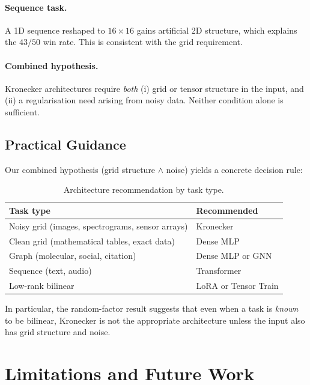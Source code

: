\documentclass[11pt,a4paper]{article}
\begin{document}
\paragraph{Sequence task.}
A 1D sequence reshaped to $16 \times 16$ gains artificial 2D
structure, which explains the $43/50$ win rate. This is
consistent with the grid requirement.

\paragraph{Combined hypothesis.}
Kronecker architectures require \emph{both} (i) grid or tensor
structure in the input, and (ii) a regularisation need arising
from noisy data. Neither condition alone is sufficient.


\subsection{Practical Guidance}

Our combined hypothesis (grid structure $\land$ noise) yields a
concrete decision rule:

\begin{table}[h]
\centering
\caption{Architecture recommendation by task type.}
\label{tab:guide}
\small
\begin{tabular}{ll}
\toprule
Task type & Recommended \\
\midrule
Noisy grid (images, spectrograms, sensor arrays) & Kronecker \\
Clean grid (mathematical tables, exact data)     & Dense MLP \\
Graph (molecular, social, citation)              & Dense MLP or GNN \\
Sequence (text, audio)                           & Transformer \\
Low-rank bilinear                                & LoRA or Tensor Train \\
\bottomrule
\end{tabular}
\end{table}

In particular, the random-factor result suggests that even when a
task is \emph{known} to be bilinear, Kronecker is not the
appropriate architecture unless the input also has grid structure
and noise.

\section{Limitations and Future Work}
\label{sec:limitations}
\end{document}
